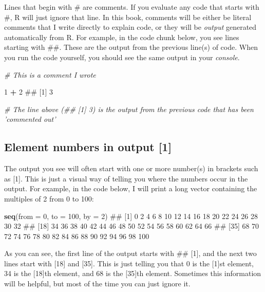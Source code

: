 \documentclass[]{book}
\newenvironment{Shaded}{\begin{snugshade}}{\end{snugshade}}
\newcommand{\KeywordTok}[1]{\textcolor[rgb]{0.13,0.29,0.53}{\textbf{#1}}}
\newcommand{\DataTypeTok}[1]{\textcolor[rgb]{0.13,0.29,0.53}{#1}}
\newcommand{\DecValTok}[1]{\textcolor[rgb]{0.00,0.00,0.81}{#1}}
\newcommand{\StringTok}[1]{\textcolor[rgb]{0.31,0.60,0.02}{#1}}
\newcommand{\CommentTok}[1]{\textcolor[rgb]{0.56,0.35,0.01}{\textit{#1}}}
\newcommand{\OperatorTok}[1]{\textcolor[rgb]{0.81,0.36,0.00}{\textbf{#1}}}
\newcommand{\NormalTok}[1]{#1}
\theoremstyle{definition}
\theoremstyle{definition}
\theoremstyle{remark}
\begin{document}
Lines that begin with \# are comments. If you evaluate any code that
starts with \#, R will just ignore that line. In this book, comments
will be either be literal comments that I write directly to explain
code, or they will be \emph{output} generated automatically from R. For
example, in the code chunk below, you see lines starting with \#\#.
These are the output from the previous line(s) of code. When you run the
code yourself, you should see the same output in your \emph{console}.

\begin{Shaded}
\begin{Highlighting}[]
\CommentTok{# This is a comment I wrote}

\DecValTok{1} \OperatorTok{+}\StringTok{ }\DecValTok{2}
\NormalTok{## [1] 3}

\CommentTok{# The line above (## [1] 3) is the output from the previous code that has been 'commented out'}
\end{Highlighting}
\end{Shaded}

\subsection{Element numbers in output
{[}1{]}}\label{element-numbers-in-output-1}

The output you see will often start with one or more number(s) in
brackets such as {[}1{]}. This is just a visual way of telling you where
the numbers occur in the output. For example, in the code below, I will
print a long vector containing the multiples of 2 from 0 to 100:

\begin{Shaded}
\begin{Highlighting}[]
\KeywordTok{seq}\NormalTok{(}\DataTypeTok{from =} \DecValTok{0}\NormalTok{, }\DataTypeTok{to =} \DecValTok{100}\NormalTok{, }\DataTypeTok{by =} \DecValTok{2}\NormalTok{)}
\NormalTok{##  [1]   0   2   4   6   8  10  12  14  16  18  20  22  24  26  28  30  32}
\NormalTok{## [18]  34  36  38  40  42  44  46  48  50  52  54  56  58  60  62  64  66}
\NormalTok{## [35]  68  70  72  74  76  78  80  82  84  86  88  90  92  94  96  98 100}
\end{Highlighting}
\end{Shaded}

As you can see, the first line of the output starts with \#\# {[}1{]},
and the next two lines start with {[}18{]} and {[}35{]}. This is just
telling you that 0 is the {[}1{]}st element, 34 is the {[}18{]}th
element, and 68 is the {[}35{]}th element. Sometimes this information
will be helpful, but most of the time you can just ignore it.
\end{document}
